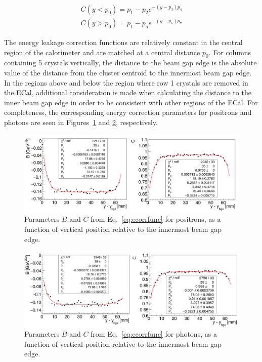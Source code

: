 \begin{equation}
\begin{split}
\label{eq:p2parlt}
C(y<p_0) = p_1-p_2 e^{-(y-p_3)p_4}\\
C(y>p_0) = p_1-p_5 e^{-(y-p_6)p_7}
\end{split}
\end{equation}

The energy leakage correction functions are relatively constant in the central region of the calorimeter and are matched at a central distance $p_0$. For columns containing 5 crystals vertically, the distance to the beam gap edge is the absolute value of the distance from the cluster centroid to the innermost beam gap edge. In the regions above and below the region where row 1 crystals are removed in the ECal, additional consideration is made when calculating the distance to the inner beam gap edge in order to be consistent with other regions of the ECal. For completeness, the corresponding energy correction parameters for positrons and photons are seen in Figures~\ref{Figure:sfparEdgeEP} and \ref{Figure:sfparEdgeP}, respectively. 


\begin{figure}[H]
  \centering
      \includegraphics[width=1.0\textwidth]{pics/performance/sfparEdge_ep.png}
  \caption[ECal energy shower parameters for positrons relative to the inside beam gap edge]{Parameters $B$ and $C$ from Eq.~\ref{eq:ecorrfunc} for positrons, as a function of vertical position
relative to the innermost beam gap edge.}
  \label{Figure:sfparEdgeEP}
\end{figure}

\begin{figure}[H]
  \centering
      \includegraphics[width=1.0\textwidth]{pics/performance/sfparEdge_p.png}
  \caption[ECal energy shower parameters for photons relative to the inside beam gap edge]{Parameters $B$ and $C$ from Eq.~\ref{eq:ecorrfunc} for photons, as a function of vertical position
relative to the innermost beam gap edge.}
  \label{Figure:sfparEdgeP}
\end{figure}

